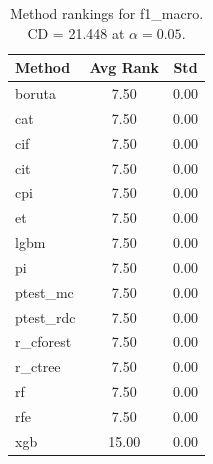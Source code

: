 \begin{table}[h]
\centering
\caption{Method rankings for f1_macro. CD = 21.448 at $\alpha=0.05$.}
\label{tab:ranks_f1_macro}
\begin{tabular}{lcc}
\toprule
Method & Avg Rank & Std \\
\midrule
boruta & 7.50 & 0.00 \\
cat & 7.50 & 0.00 \\
cif & 7.50 & 0.00 \\
cit & 7.50 & 0.00 \\
cpi & 7.50 & 0.00 \\
et & 7.50 & 0.00 \\
lgbm & 7.50 & 0.00 \\
pi & 7.50 & 0.00 \\
ptest_mc & 7.50 & 0.00 \\
ptest_rdc & 7.50 & 0.00 \\
r_cforest & 7.50 & 0.00 \\
r_ctree & 7.50 & 0.00 \\
rf & 7.50 & 0.00 \\
rfe & 7.50 & 0.00 \\
xgb & 15.00 & 0.00 \\
\bottomrule
\end{tabular}
\end{table}